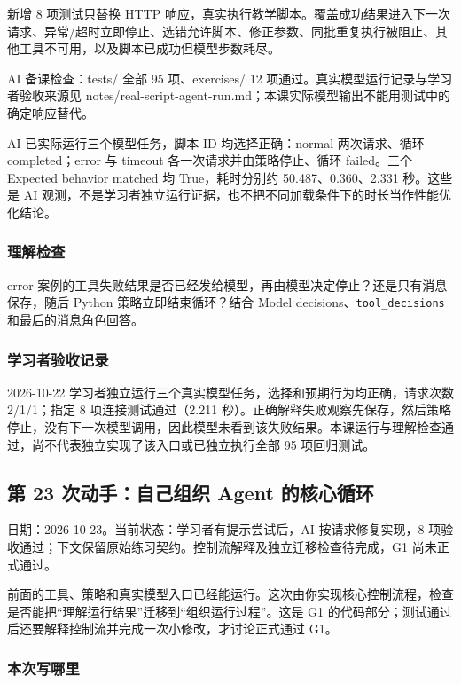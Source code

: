 新增 8 项测试只替换 HTTP 响应，真实执行教学脚本。覆盖成功结果进入下一次请求、异常/超时立即停止、选错允许脚本、修正参数、同批重复执行被阻止、其他工具不可用，以及脚本已成功但模型步数耗尽。

AI 备课检查：tests/ 全部 95 项、exercises/ 12 项通过。真实模型运行记录与学习者验收来源见 notes/real-script-agent-run.md；本课实际模型输出不能用测试中的确定响应替代。

AI 已实际运行三个模型任务，脚本 ID 均选择正确：normal 两次请求、循环 completed；error 与 timeout 各一次请求并由策略停止、循环 failed。三个 Expected behavior matched 均 True，耗时分别约 50.487、0.360、2.331 秒。这些是 AI 观测，不是学习者独立运行证据，也不把不同加载条件下的时长当作性能优化结论。

\subsubsection{理解检查}

error 案例的工具失败结果是否已经发给模型，再由模型决定停止？还是只有消息保存，随后 Python 策略立即结束循环？结合 Model decisions、\nolinkurl{tool_decisions} 和最后的消息角色回答。

\subsubsection{学习者验收记录}

2026-10-22 学习者独立运行三个真实模型任务，选择和预期行为均正确，请求次数 2/1/1；指定 8 项连接测试通过（2.211 秒）。正确解释失败观察先保存，然后策略停止，没有下一次模型调用，因此模型未看到该失败结果。本课运行与理解检查通过，尚不代表独立实现了该入口或已独立执行全部 95 项回归测试。

\subsection{第 23 次动手：自己组织 Agent 的核心循环}

日期：2026-10-23。当前状态：学习者有提示尝试后，AI 按请求修复实现，8 项验收通过；下文保留原始练习契约。控制流解释及独立迁移检查待完成，G1 尚未正式通过。

前面的工具、策略和真实模型入口已经能运行。这次由你实现核心控制流程，检查是否能把“理解运行结果”迁移到“组织运行过程”。这是 G1 的代码部分；测试通过后还要解释控制流并完成一次小修改，才讨论正式通过 G1。

\subsubsection{本次写哪里}

